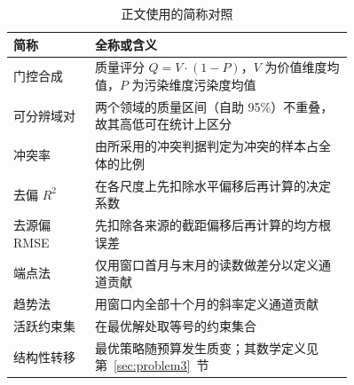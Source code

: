 \begin{table}[H]
  \centering
  \caption{正文使用的简称对照}
  \label{tab:symbols-abbrev}
  \begin{tabular}{@{}lp{0.76\linewidth}@{}}
    \toprule
    简称 & 全称或含义 \\
    \midrule
    门控合成 & 质量评分 $Q=V\cdot(1-P)$，$V$ 为价值维度均值，$P$ 为污染维度污染度均值 \\
    可分辨域对 & 两个领域的质量区间（自助 95\%）不重叠，故其高低可在统计上区分 \\
    冲突率 & 由所采用的冲突判据判定为冲突的样本占全体的比例 \\
    去偏 $R^2$ & 在各尺度上先扣除水平偏移后再计算的决定系数 \\
    去源偏 RMSE & 先扣除各来源的截距偏移后再计算的均方根误差 \\
    端点法 & 仅用窗口首月与末月的读数做差分以定义通道贡献 \\
    趋势法 & 用窗口内全部十个月的斜率定义通道贡献 \\
    活跃约束集 & 在最优解处取等号的约束集合 \\
    结构性转移 & 最优策略随预算发生质变；其数学定义见第~\ref{sec:problem3}~节 \\
    \bottomrule
  \end{tabular}
\end{table}
